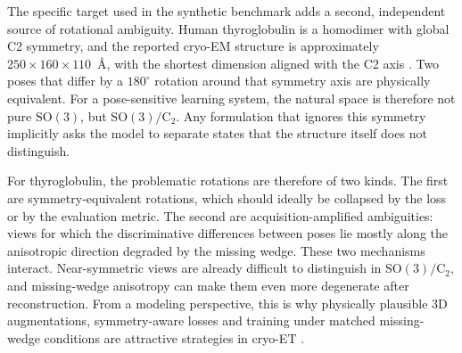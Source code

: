 \documentclass[12pt,a4paper]{report}
\begin{document}
The specific target used in the synthetic benchmark adds a second, independent source of rotational ambiguity. Human thyroglobulin is a homodimer with global C2 symmetry, and the reported cryo-EM structure is approximately \(250 \times 160 \times 110\)~\AA{}, with the shortest dimension aligned with the C2 axis \cite{adaixo2022thyroglobulin}. Two poses that differ by a \(180^\circ\) rotation around that symmetry axis are physically equivalent. For a pose-sensitive learning system, the natural space is therefore not pure \(\mathrm{SO}(3)\), but \(\mathrm{SO}(3)/\mathrm{C}_2\). Any formulation that ignores this symmetry implicitly asks the model to separate states that the structure itself does not distinguish.

For thyroglobulin, the problematic rotations are therefore of two kinds. The first are symmetry-equivalent rotations, which should ideally be collapsed by the loss or by the evaluation metric. The second are acquisition-amplified ambiguities: views for which the discriminative differences between poses lie mostly along the anisotropic direction degraded by the missing wedge. These two mechanisms interact. Near-symmetric views are already difficult to distinguish in \(\mathrm{SO}(3)/\mathrm{C}_2\), and missing-wedge anisotropy can make them even more degenerate after reconstruction. From a modeling perspective, this is why physically plausible 3D augmentations, symmetry-aware losses and training under matched missing-wedge conditions are attractive strategies in cryo-ET \cite{weiler2018steerable3d,liu2022isonet,zhao2023computational}.
\end{document}
